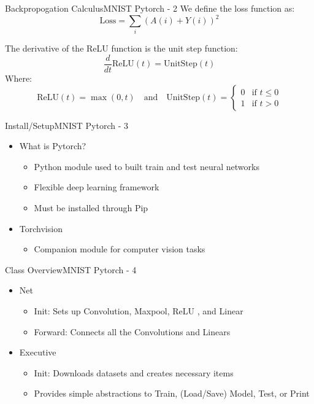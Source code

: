 \documentclass{beamer}
\begin{document}
\begin{frame}{Backpropogation Calculus}{MNIST Pytorch - 2}
    We define the loss function as:
        \[ \text{Loss} = \sum_i (A(i) + Y(i))^2 \]
    
    The derivative of the ReLU function is the unit step function:
    \[ \frac{d}{dt} \text{ReLU}(t) = \text{UnitStep}(t) \]
    Where: \[ \text{ReLU}(t) = \max(0, t) 
        \quad \text{and} \quad
        \text{UnitStep}(t) =
        \begin{cases}
            0 & \text{if } t \leq 0 \\
            1 & \text{if } t > 0
        \end{cases}
    \]
\end{frame}

\begin{frame}{Install/Setup}{MNIST Pytorch - 3}
\begin{itemize}
    \item What is Pytorch? 
    \begin{itemize}
        \item Python module used to built train and test neural networks
        \item Flexible deep learning framework
        \item Must be installed through Pip
    \end{itemize}
        
    \item Torchvision 
    \begin{itemize}
        \item Companion module for computer vision tasks
    \end{itemize}
\end{itemize}
\end{frame}

\begin{frame}{Class Overview}{MNIST Pytorch - 4}
\begin{itemize}
    \item Net
    \begin{itemize}
        \item Init: Sets up Convolution, Maxpool, ReLU , and Linear
        \item Forward: Connects all the Convolutions and Linears 
    \end{itemize}
        
    \item Executive
    \begin{itemize}
        \item Init: Downloads datasets and creates necessary items
        \item Provides simple abstractions to Train, (Load/Save) Model, Test, or Print
    \end{itemize}
\end{itemize}
\end{frame}
\end{document}
